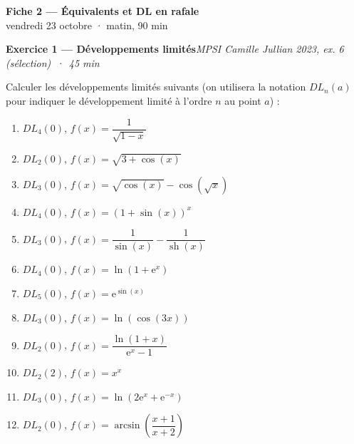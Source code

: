 \documentclass[11pt,a4paper]{article}
\newcommand{\sh}{\operatorname{sh}}
\newcommand{\ee}{\mathrm{e}}
\newcommand{\exo}[3]{\vspace{1.1em}\noindent\textbf{\large #1}\hfill\textit{#2 \,·\, #3}\par\smallskip}
\begin{document}
\begin{center}
{\LARGE\bfseries Fiche 2 — Équivalents et DL en rafale}\\[0.3em]
{\large vendredi 23 octobre · matin, 90 min}
\end{center}

\noindent{}


\exo{Exercice 1 — Développements limités}{MPSI Camille Jullian 2023, ex. 6 (sélection)}{45 min}
\noindent Calculer les développements limités suivants (on utilisera la notation $DL_n(a)$ pour indiquer le développement limité à l'ordre $n$ au point $a$) :
\begin{enumerate}[label=\arabic*.,itemsep=0.45em,leftmargin=*]
\item $DL_4(0)$, $f(x)=\dfrac{1}{\sqrt{1-x}}$
\item $DL_2(0)$, $f(x)=\sqrt{3+\cos(x)}$
\item $DL_3(0)$, $f(x)=\sqrt{\cos(x)}-\cos(\sqrt{x})$
\item $DL_4(0)$, $f(x)=(1+\sin(x))^x$
\item $DL_3(0)$, $f(x)=\dfrac{1}{\sin(x)}-\dfrac{1}{\sh(x)}$
\item $DL_4(0)$, $f(x)=\ln(1+\ee^x)$
\item $DL_5(0)$, $f(x)=\ee^{\sin(x)}$
\item $DL_3(0)$, $f(x)=\ln(\cos(3x))$
\item $DL_2(0)$, $f(x)=\dfrac{\ln(1+x)}{\ee^x-1}$
\item $DL_2(2)$, $f(x)=x^x$
\item $DL_3(0)$, $f(x)=\ln(2\ee^x+\ee^{-x})$
\item $DL_2(0)$, $f(x)=\arcsin\!\left(\dfrac{x+1}{x+2}\right)$
\end{enumerate}
\end{document}
